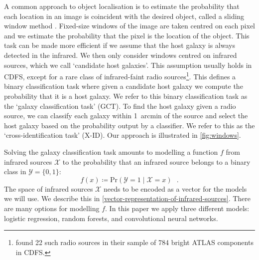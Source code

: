 \documentclass[fleqn,usenatbib,usedcolumn]{mnras}
\begin{document}
    A common approach to object localisation is to estimate the probability
    that each location in an image is coincident with the desired object,
    called a sliding window method \citep[e.g.][]{rowley1996facedetection}.
    Fixed-size windows of the image are taken centred on each pixel and we
    estimate the probability that the pixel is the location of the object.
    This task can be made more efficient if we assume that the host galaxy is
    always detected in the infrared. We then only consider windows centred on
    infrared sources, which we call `candidate host galaxies'. This assumption
    usually holds in CDFS, except for a rare class of infrared-faint radio
    sources\footnote{\citet{norris06} found 22 such radio sources in their
    sample of 784 bright ATLAS components in CDFS.}. This defines a binary
    classification task where given a candidate host galaxy we compute the
    probability that it is a host galaxy. We refer to this binary
    classification task as the `galaxy classification task' (GCT). To find the host
    galaxy given a radio source, we can classify each galaxy within 1~arcmin
    of the source and select the host galaxy based on the probability output
    by a classifier. We refer to this as the `cross-identification task' (X-ID). Our
    approach is illustrated in \autoref{fig:windows}.

    Solving the galaxy classification task amounts to modelling a function $f$
    from infrared sources $\mathcal{X}$ to the probability that an infrared
    source belongs to a binary class in $\mathcal{Y} = \{0, 1\}$:
    \begin{equation}
        f(x) \coloneqq \text{Pr}\left(\mathcal{Y} = 1 \mid \mathcal X = x\right)\,\,\,\,.
    \end{equation}
    The space of infrared sources $\mathcal{X}$ needs to be encoded as a vector
    for the models we will use. We describe this in
    \autoref{vector-representation-of-infrared-sources}. There are many options
    for modelling $f$. In this paper we apply three different models: logistic
    regression, random forests, and convolutional neural networks.
\end{document}
